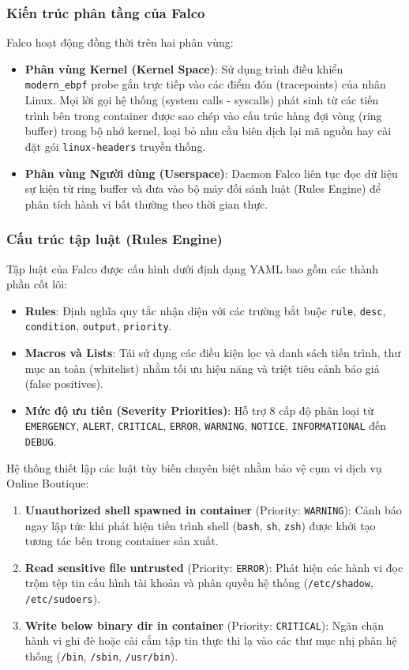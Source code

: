 \subsubsection{Kiến trúc phân tầng của Falco}
Falco hoạt động đồng thời trên hai phân vùng:
\begin{itemize}
    \item \textbf{Phân vùng Kernel (Kernel Space)}: Sử dụng trình điều khiển \texttt{modern\_ebpf} probe gắn trực tiếp vào các điểm đón (tracepoints) của nhân Linux. Mọi lời gọi hệ thống (system calls - syscalls) phát sinh từ các tiến trình bên trong container được sao chép vào cấu trúc hàng đợi vòng (ring buffer) trong bộ nhớ kernel, loại bỏ nhu cầu biên dịch lại mã nguồn hay cài đặt gói \texttt{linux-headers} truyền thống.
    \item \textbf{Phân vùng Người dùng (Userspace)}: Daemon Falco liên tục đọc dữ liệu sự kiện từ ring buffer và đưa vào bộ máy đối sánh luật (Rules Engine) để phân tích hành vi bất thường theo thời gian thực.
\end{itemize}

\subsubsection{Cấu trúc tập luật (Rules Engine)}
Tập luật của Falco được cấu hình dưới định dạng YAML bao gồm các thành phần cốt lõi:
\begin{itemize}
    \item \textbf{Rules}: Định nghĩa quy tắc nhận diện với các trường bắt buộc \texttt{rule}, \texttt{desc}, \texttt{condition}, \texttt{output}, \texttt{priority}.
    \item \textbf{Macros và Lists}: Tái sử dụng các điều kiện lọc và danh sách tiến trình, thư mục an toàn (whitelist) nhằm tối ưu hiệu năng và triệt tiêu cảnh báo giả (false positives).
    \item \textbf{Mức độ ưu tiên (Severity Priorities)}: Hỗ trợ 8 cấp độ phân loại từ \texttt{EMERGENCY}, \texttt{ALERT}, \texttt{CRITICAL}, \texttt{ERROR}, \texttt{WARNING}, \texttt{NOTICE}, \texttt{INFORMATIONAL} đến \texttt{DEBUG}.
\end{itemize}
Hệ thống thiết lập các luật tùy biến chuyên biệt nhằm bảo vệ cụm vi dịch vụ Online Boutique:
\begin{enumerate}
    \item \textbf{Unauthorized shell spawned in container} (Priority: \texttt{WARNING}): Cảnh báo ngay lập tức khi phát hiện tiến trình shell (\texttt{bash}, \texttt{sh}, \texttt{zsh}) được khởi tạo tương tác bên trong container sản xuất.
    \item \textbf{Read sensitive file untrusted} (Priority: \texttt{ERROR}): Phát hiện các hành vi đọc trộm tệp tin cấu hình tài khoản và phân quyền hệ thống (\texttt{/etc/shadow}, \texttt{/etc/sudoers}).
    \item \textbf{Write below binary dir in container} (Priority: \texttt{CRITICAL}): Ngăn chặn hành vi ghi đè hoặc cài cắm tập tin thực thi lạ vào các thư mục nhị phân hệ thống (\texttt{/bin}, \texttt{/sbin}, \texttt{/usr/bin}).
\end{enumerate}

